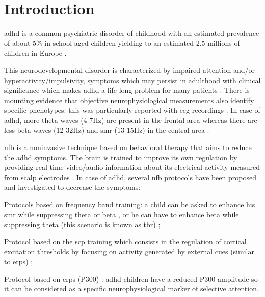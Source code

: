 

\section{Introduction} 

\gls{adhd} is a common psychiatric disorder of childhood with an estimated prevalence of about 5\% in school-aged children yielding to an 
estimated 2.5 millions of children in Europe \citep{DSM-5}.

This neurodevelopmental disorder is characterized by impaired attention and/or hyperactivity/impulsivity, symptoms which may persist 
in adulthood with clinical significance which makes \gls{adhd} a life-long problem for many patients \citep{Faraone2006}. There is mounting evidence 
that objective neurophysiological  measurements also identify specific phenotypes: this was particularly reported with \gls{eeg} 
recordings \citep{loo2017}. In case of \gls{adhd}, more theta waves (4-7Hz) are present in the frontal area
 whereas there are less beta waves (12-32Hz) and \gls{smr} (13-15Hz) in the central area \citep{Monastra2005, Matouvsek1984,
 Janzen1995}. 

\gls{nfb} is a noninvasive technique based on behavioral therapy that aims to reduce the \gls{adhd} symptoms.
 The brain is trained to improve its own regulation by providing real-time video/audio information 
about its electrical activity measured from scalp electrodes \citep{Arns2015, Steffert2010}. In case of \gls{adhd}, several
 \gls{nfb} protocols have been proposed and investigated to decrease the symptoms: 
\begin{description}
	\item Protocols based on frequency band training: a child can be asked to enhance his \gls{smr} 
	while suppressing theta or beta \citep{Lubar1976}, or he can have to enhance beta
	while suppressing theta (this scenario is known as \gls{tbr}) \citep{Arns2013};
	\item Protocol based on the \gls{scp} training which consists in the regulation of cortical excitation 
	thresholds by focusing on activity generated by external cues 
	(similar to \gls{erps}) \citep{Heinrich2004, Banaschewski2007}; 
	\item Protocol based on \gls{erps} (P300) \citep{Fouillen2017}: \gls{adhd} children have a reduced P300 
	amplitude so it can be considered as a specific neurophysiological marker 
	of selective attention. 
\end{description} 


